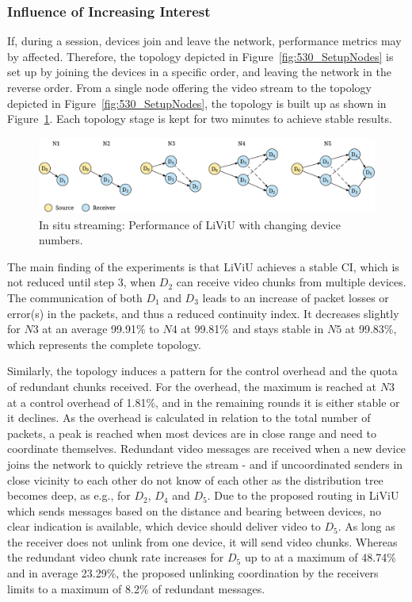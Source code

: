 \subsubsection{Influence of Increasing Interest}
If, during a session, devices join and leave the network, performance metrics may by affected.
Therefore, the topology depicted in Figure~\ref{fig:530_SetupNodes} is set up by joining the devices in a specific order, and leaving the network in the reverse order.
From a single node offering the video stream to the topology depicted in Figure~\ref{fig:530_SetupNodes}, the topology is built up as shown in Figure~\ref{fig:530_SetupNodes_stepBystep}.
Each topology stage is kept for two minutes to achieve stable results.
\begin{figure}[tbh!]
\centering
\includegraphics[width=\linewidth]{gfx/500_MobileUpload/Eval_Stationary_setup_Step_by_Step}
\caption{In situ streaming: Performance of LiViU with changing device numbers.}
\label{fig:530_SetupNodes_stepBystep}
\end{figure}
The main finding of the experiments is that LiViU achieves a stable \ac{CI}, which is not reduced until step 3, when $D_2$ can receive video chunks from multiple devices.
The communication of both $D_1$ and $D_3$ leads to an increase of packet losses or error(s) in the packets, and thus a reduced continuity index.
It decreases slightly for $N3$ at an average 99.91\% to $N4$  at 99.81\% and stays stable in $N5$ at 99.83\%, which represents the complete topology.

Similarly, the topology induces a pattern for the control overhead and the quota of redundant chunks received.
For the overhead, the maximum is reached at $N3$ at a control overhead of 1.81\%, and in the remaining rounds it is either stable or it declines.
As the overhead is calculated in relation to the total number of packets, a peak is reached when most devices are in close range and need to coordinate themselves.
Redundant video messages are received when a new device joins the network to quickly retrieve the stream - and if uncoordinated senders in close vicinity to each other do not know of each other as the distribution tree becomes deep, as e.g., for $D_2$, $D_4$ and $D_5$.
Due to the proposed routing in \ac{LiViU} which sends messages based on the distance and bearing between devices, no clear indication is available, which device should deliver video to $D_5$.
As long as the receiver does not unlink from one device, it will send video chunks.
Whereas the redundant video chunk rate increases for $D_5$ up to at a maximum of 48.74\% and in average 23.29\%, the proposed unlinking coordination by the receivers limits to a maximum of 8.2\% of redundant messages.
